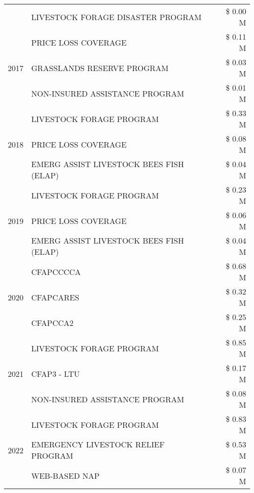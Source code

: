 \begin{tabular}{llr}
 & LIVESTOCK FORAGE DISASTER PROGRAM & \$ 0.00 M \\
\cline{1-3}
\multirow[t]{3}{*}{2017} & PRICE LOSS COVERAGE & \$ 0.11 M \\
 & GRASSLANDS RESERVE PROGRAM & \$ 0.03 M \\
 & NON-INSURED ASSISTANCE PROGRAM & \$ 0.01 M \\
\cline{1-3}
\multirow[t]{3}{*}{2018} & LIVESTOCK FORAGE PROGRAM & \$ 0.33 M \\
 & PRICE LOSS COVERAGE & \$ 0.08 M \\
 & EMERG ASSIST LIVESTOCK BEES FISH (ELAP) & \$ 0.04 M \\
\cline{1-3}
\multirow[t]{3}{*}{2019} & LIVESTOCK FORAGE PROGRAM & \$ 0.23 M \\
 & PRICE LOSS COVERAGE & \$ 0.06 M \\
 & EMERG ASSIST LIVESTOCK BEES FISH (ELAP) & \$ 0.04 M \\
\cline{1-3}
\multirow[t]{3}{*}{2020} & CFAPCCCCA & \$ 0.68 M \\
 & CFAPCARES & \$ 0.32 M \\
 & CFAPCCA2 & \$ 0.25 M \\
\cline{1-3}
\multirow[t]{3}{*}{2021} & LIVESTOCK FORAGE PROGRAM & \$ 0.85 M \\
 & CFAP3 - LTU & \$ 0.17 M \\
 & NON-INSURED ASSISTANCE PROGRAM & \$ 0.08 M \\
\cline{1-3}
\multirow[t]{3}{*}{2022} & LIVESTOCK FORAGE PROGRAM & \$ 0.83 M \\
 & EMERGENCY LIVESTOCK RELIEF PROGRAM & \$ 0.53 M \\
 & WEB-BASED NAP & \$ 0.07 M \\
\cline{1-3}
\bottomrule
\end{tabular}
